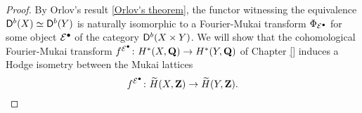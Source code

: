 \begin{proof}
    By Orlov's result \ref{Orlov's theorem}, the functor witnessing the equivalence $\mathsf{D}^b(X) \simeq \mathsf{D}^b(Y)$ is naturally isomorphic to a Fourier-Mukai transform $\Phi_{\mathcal E^\bullet}$ for some object $\mathcal E^\bullet$ of the category $\mathsf{D}^b(X \times Y)$. We will show that the cohomological Fourier-Mukai transform $f^{\mathcal E^\bullet} \colon H^*(X, \mathbf Q) \to H^*(Y, \mathbf Q)$ of Chapter \ref{} induces a Hodge isometry between the Mukai lattices
    \[
        f^{\mathcal E^\bullet} \colon \widetilde{H}(X, \mathbf Z) \to \widetilde{H}(Y, \mathbf Z).
    \]
\end{proof}